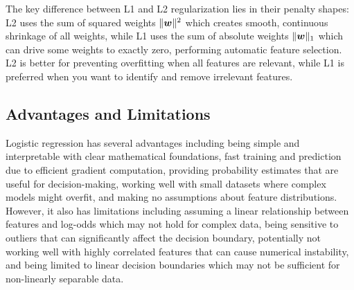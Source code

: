 \begin{remark}
The key difference between L1 and L2 regularization lies in their penalty shapes: L2 uses the sum of squared weights $\|\boldsymbol{w}\|^2$ which creates smooth, continuous shrinkage of all weights, while L1 uses the sum of absolute weights $\|\boldsymbol{w}\|_1$ which can drive some weights to exactly zero, performing automatic feature selection. L2 is better for preventing overfitting when all features are relevant, while L1 is preferred when you want to identify and remove irrelevant features.
\end{remark}

\subsection{Advantages and Limitations}

Logistic regression has several advantages including being simple and interpretable with clear mathematical foundations, fast training and prediction due to efficient gradient computation, providing probability estimates that are useful for decision-making, working well with small datasets where complex models might overfit, and making no assumptions about feature distributions. However, it also has limitations including assuming a linear relationship between features and log-odds which may not hold for complex data, being sensitive to outliers that can significantly affect the decision boundary, potentially not working well with highly correlated features that can cause numerical instability, and being limited to linear decision boundaries which may not be sufficient for non-linearly separable data.

